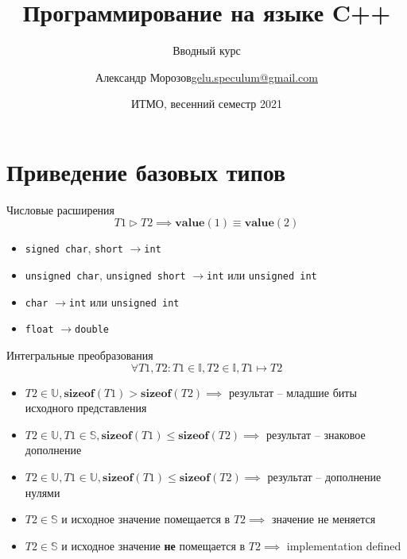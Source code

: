 \documentclass[unknownkeysallowed,xcolor=table]{beamer}
\title[C++]
{Программирование на языке C++}
\subtitle{Вводный курс}
\author[А.~Б.~Морозов]
{
  \texorpdfstring{Александр Морозов\newline\href{mailto:gelu.speculum@gmail.com}{gelu.speculum@gmail.com}}
  {Александр Морозов}
}
\date[ITMO 2021]
{ИТМО, весенний семестр 2021}
\newcommand{\rarr}{$\rightarrow$}
\begin{document}
 
\frame{\titlepage}

\section{Приведение базовых типов}

\begin{frame}[fragile]{Числовые расширения}
  \[
    T1 \triangleright T2 \implies \mathbf{value}(1) \equiv \mathbf{value}(2)
  \]
  
  \vspace{1em}

  \begin{itemize}
    \item \lstinline{signed char}, \lstinline{short} \rarr \lstinline{int} \vspace{1em}
    \item \lstinline{unsigned char}, \lstinline{unsigned short} \rarr \lstinline{int} или \lstinline{unsigned int} \vspace{1em}
    \item \lstinline{char} \rarr \lstinline{int} или \lstinline{unsigned int} \vspace{1em}
    \item \lstinline{float} \rarr \lstinline{double}
  \end{itemize}
\end{frame}

\begin{frame}[fragile]{Интегральные преобразования}
  \[
    \forall T1, T2: T1 \in \mathbb{I}, T2 \in \mathbb{I}, T1 \mapsto T2
  \]

  \vspace{0.5em}

  \begin{itemize}
    \item $T2 \in \mathbb{U}, \mathbf{sizeof}(T1) > \mathbf{sizeof}(T2) \implies$ результат -- младшие биты исходного представления \vspace{0.5em}
    \item $T2 \in \mathbb{U}, T1 \in \mathbb{S}, \mathbf{sizeof}(T1) \leq \mathbf{sizeof}(T2) \implies$ результат -- знаковое дополнение \vspace{0.5em}
    \item $T2 \in \mathbb{U}, T1 \in \mathbb{U}, \mathbf{sizeof}(T1) \leq \mathbf{sizeof}(T2) \implies$ результат -- дополнение нулями \vspace{0.5em}
    \item $T2 \in \mathbb{S}$ и исходное значение помещается в $T2 \implies$ значение не меняется \vspace{0.5em}
    \item $T2 \in \mathbb{S}$ и исходное значение \textbf{не} помещается в $T2 \implies$ implementation defined
  \end{itemize}
\end{frame}
\end{document}
